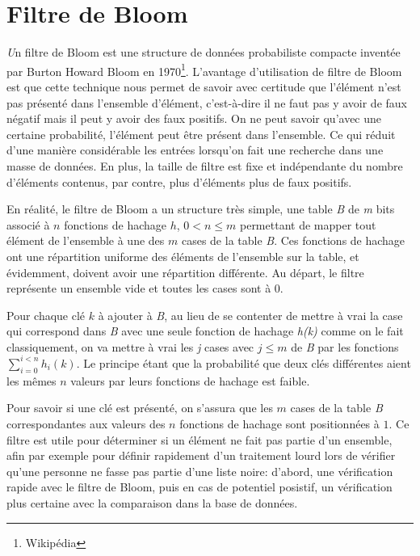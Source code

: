 \chapter{Filtre de Bloom}
	{\huge \itshape U}n filtre de Bloom est une structure de données probabiliste compacte inventée par Burton Howard Bloom en 1970\footnote{Wikipédia}. L'avantage d'utilisation de filtre de Bloom est que cette technique nous permet de savoir avec certitude que l'élément n'est pas présenté dans l'ensemble d'élément, c'est-à-dire il ne faut pas y avoir de faux négatif mais il peut y avoir des faux positifs. On ne peut savoir qu'avec une certaine probabilité, l'élément peut être présent dans l'ensemble. Ce qui réduit d'une manière considérable les entrées lorsqu'on fait une recherche dans une masse de données. En plus, la taille de filtre est fixe et indépendante du nombre d'éléments contenus, par contre, plus d'éléments plus de faux positifs.
	
	En réalité, le filtre de Bloom a un structure très simple, une table \textit{B} de \textit{m} bits associé à $n$ fonctions de hachage $h$, $0 < n \leq m$ permettant de mapper tout élément de l'ensemble à une des $m$ cases de la table \textit{B}. Ces fonctions de hachage ont une répartition uniforme des éléments de l'ensemble sur la table, et évidemment, doivent avoir une répartition différente. Au départ, le filtre représente un ensemble vide et toutes les cases sont à 0.
	
	Pour chaque clé $k$ à ajouter à \textit{B}, au lieu de se contenter de mettre à vrai la case qui correspond dans \textit{B} avec une seule fonction de hachage \textit{h(k)} comme on le fait classiquement, on va mettre à vrai les \textit{j} cases avec $j \leq m$ de \textit{B} par les fonctions $\sum_{i = 0}^{i < n}h_i(k)$. Le principe étant que la probabilité que deux clés différentes aient les mêmes $n$ valeurs par leurs fonctions de hachage est faible.
	
	Pour savoir si une clé est présenté, on s'assura que les $m$ cases de la table \textit{B} correspondantes aux valeurs des $n$ fonctions de hachage sont positionnées à $1$. Ce filtre est utile pour déterminer si un élément ne fait pas partie d'un ensemble, afin par exemple pour définir rapidement d'un traitement lourd lors de vérifier qu'une personne ne fasse pas partie d'une liste noire: d'abord, une vérification rapide avec le filtre de Bloom, puis en cas de potentiel posistif, un vérification plus certaine avec la comparaison dans la base de données.
	

